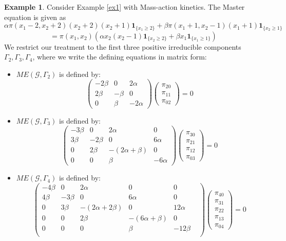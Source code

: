 \documentclass{amsart}
\theoremstyle{definition}
\newtheorem{example}[theorem]{Example}
\theoremstyle{remark}
\theoremstyle{Conjecture/open problem}
\theoremstyle{assumption}
\theoremstyle{conjecture}
\def\a{\alpha}
\def\be{\beta}
\def\Ga{\Gamma}
\def\1{\mathbf{1}}
\def\cG{\mathcal{G}}
\numberwithin{equation}{section}
\begin{document}
\begin{example}\label{ex1_}
Consider Example \ref{ex1} with Mass-action kinetics. The Master equation is given as
$$\a\pi(x_1-2,x_2+2)(x_2+2)(x_2+1)\1_{\{x_1\geq 2\}}+\be\pi(x_1+1,x_2-1)(x_1+1)\1_{\{x_2\geq 1\}}$$ 
$$=\pi(x_1,x_2)(\a x_2(x_2-1)\1_{\{x_2\geq 2\}}+\be x_1\1_{\{x_1\geq 1\}})$$
We restrict our treatment to the first three positive irreducible components $\Ga_2,\Ga_3,\Ga_4$, where we write the defining equations in matrix form:



\begin{itemize}

\item $ME(\cG,\Ga_2)$ is defined by:\hfill\break
\begin{equation*}
\begin{pmatrix}
-2\be  &0  &   2\a   \\
  2\be& -\be& 0  \\
0&\be&-2\a    
\end{pmatrix}
\begin{pmatrix}
    \pi_{20}\\\pi_{11}\\\pi_{02}
\end{pmatrix}=0
\end{equation*}

\item
$ME(\cG,\Ga_3)$ is defined by:\hfill\break
\begin{equation*}
\begin{pmatrix}
-3\be  &0  &   2\a &0  \\
  3\be& -2\be& 0&6\a  \\
0&2\be&-(2\a  +\be)&0\\
0&0&\be&-6\a 
\end{pmatrix}
\begin{pmatrix}
    \pi_{30}\\\pi_{21}\\\pi_{12}\\\pi_{03}
\end{pmatrix}=0
\end{equation*}

\item
$ME(\cG,\Ga_4)$ is defined by:\hfill\break
\begin{equation*}
\begin{pmatrix}
-4\be  &0  &   2\a &0&0  \\
  4\be& -3\be& 0&6\a &0 \\
0&3\be&-(2\a  +2\be)&0&12\a\\
0&0&2\be&-(6\a+\be)&0\\
 0&0&0&\be&-12\be&\\
\end{pmatrix}
\begin{pmatrix}
    \pi_{40}\\\pi_{31}\\\pi_{22}\\\pi_{13}\\\pi_{04}
\end{pmatrix}=0
\end{equation*}




\end{itemize}
\end{example}
\end{document}
